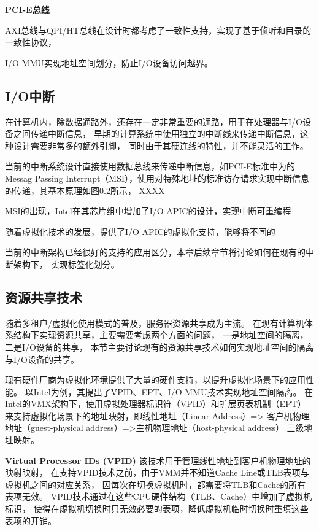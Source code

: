 \textbf{PCI-E总线}

AXI总线与QPI/HT总线在设计时都考虑了一致性支持，实现了基于侦听和目录的一致性协议，

I/O MMU实现地址空间划分，防止I/O设备访问越界。


\subsection{I/O中断}
在计算机内，除数据通路外，还存在一定非常重要的通路，用于在处理器与I/O设备之间传递中断信息，
早期的计算系统中使用独立的中断线来传递中断信息，这种设计需要非常多的额外引脚，
同时由于其硬连线的特性，并不能灵活的工作。

当前的中断系统设计直接使用数据总线来传递中断信息，如PCI-E标准中为的Messag Passing Interrupt（MSI），使用对特殊地址的标准访存请求实现中断信息的传递，其基本原理如图\ref{}所示，
XXXX

MSI的出现，Intel在其芯片组中增加了I/O-APIC的设计，实现中断可重编程

随着虚拟化技术的发展，提供了I/O-APIC的虚拟化支持，能够将不同的

当前的中断架构已经很好的支持的应用区分，本章后续章节将讨论如何在现有的中断架构下，
实现标签化划分。


\subsection{资源共享技术}
随着多租户/虚拟化使用模式的普及，服务器资源共享成为主流。
在现有计算机体系结构下实现资源共享，主要需要考虑两个方面的问题，
一是地址空间的隔离，二是I/O设备的共享，
本节主要讨论现有的资源共享技术如何实现地址空间的隔离与I/O设备的共享。

现有硬件厂商为虚拟化环境提供了大量的硬件支持，以提升虚拟化场景下的应用性能。
以Intel为例，其提出了VPID、EPT、I/O MMU技术实现地址空间隔离。
在Intel的VMX架构下，使用虚拟处理器标识符（VPID）和扩展页表机制（EPT）
来支持虚拟化场景下的地址映射，即线性地址（Linear Address）=>
客户机物理地址（guest-physical address）=>主机物理地址（host-physical address）
三级地址映射。

\textbf{Virtual Processor IDs (VPID)}\quad
该技术用于管理线性地址到客户机物理地址的映射映射，
在支持VPID技术之前，由于VMM并不知道Cache Line或TLB表项与虚拟机之间的对应关系，
因每次在切换虚拟机时，都需要将TLB和Cache的所有表项无效。
VPID技术通过在这些CPU硬件结构（TLB、Cache）中增加了虚拟机标识，
使得在虚拟机切换时只无效必要的表项，降低虚拟机临时切换时重填这些表项的开销。

